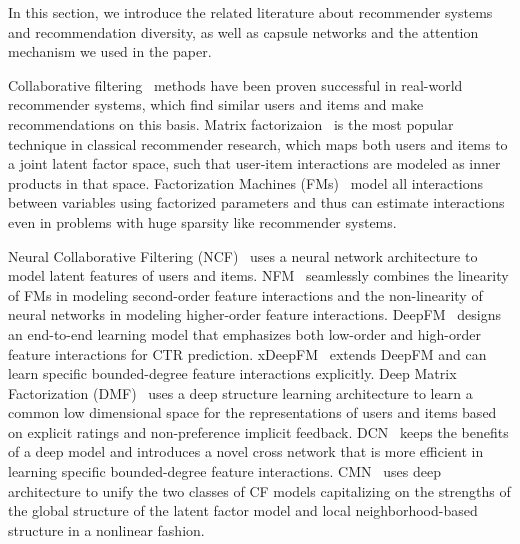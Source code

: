 
In this section, we introduce the related literature about recommender systems and recommendation diversity, as well as capsule networks and the attention mechanism we used in the paper.

Collaborative filtering~\cite{sarwar2001item,schafer2007collaborative} methods have been proven successful in real-world recommender systems, which find similar users and items and make recommendations on this basis. Matrix factorizaion~\cite{koren2009matrix} is the most popular technique in classical recommender research, which maps both users and items to a joint latent factor space, such that user-item interactions are modeled as inner products in that space. Factorization Machines (FMs)~\cite{rendle2010factorization} model all interactions between variables using factorized parameters and thus can estimate interactions even in problems with huge sparsity like recommender systems.

Neural Collaborative Filtering (NCF)~\cite{he2017neural} uses a neural network architecture to model latent features of users and items. 
NFM~\cite{he2017nfm} seamlessly combines the linearity of FMs in modeling second-order feature interactions and the non-linearity of neural networks in modeling higher-order feature interactions.
DeepFM~\cite{guo2017deepfm} designs an end-to-end learning model that emphasizes both low-order and high-order feature interactions for CTR prediction.
xDeepFM~\cite{lian2018xdeepfm} extends DeepFM and can learn specific bounded-degree feature interactions explicitly.
Deep Matrix Factorization (DMF)~\cite{xue2017deep} uses a deep structure learning architecture to learn a common low dimensional space for the representations of users and items based on explicit ratings and non-preference implicit feedback.
DCN~\cite{wang2017deep} keeps the benefits of a deep model and introduces a novel cross network that is more efficient in learning specific bounded-degree feature interactions.
CMN~\cite{ebesu2018collaborative} uses deep architecture to unify the two classes of CF models capitalizing on the strengths of the global structure of the latent factor model and local neighborhood-based structure in a nonlinear fashion.


